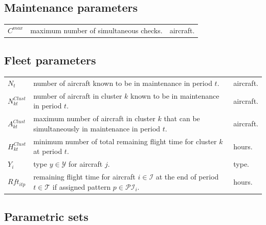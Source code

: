\documentclass[a4paper,11pt]{article}
\begin{document}
    \subsection{Maintenance parameters}

        \begin{tabular}{p{15mm}p{125mm}p{15mm}}
            $C^{max}$         & maximum number of simultaneous checks. & aircraft. \\
        \end{tabular}

    \subsection{Fleet parameters}

        \begin{tabular}{p{15mm}p{125mm}p{15mm}}
            $N_t$               & number of aircraft known to be in maintenance in period $t$. & aircraft. \\
            $N^{Clust}_{kt}$    & number of aircraft in cluster $k$ known to be in maintenance in period $t$. & aircraft. \\
            $A^{Clust}_{kt}$    & maximum number of aircraft in cluster $k$ that can be simultaneously in maintenance in period $t$. & aircraft. \\
            $H^{Clust}_{kt}$    & minimum number of total remaining flight time for cluster $k$ at period $t$. & hours. \\
            $Y_i$               & type $y \in \mathcal{Y}$ for aircraft $j$. & type. \\
            $Rft_{itp}$           & remaining flight time for aircraft $i \in \mathcal{I}$ at the end of period $t \in \mathcal{T}$ if assigned pattern $p \in \mathcal{PI}_i$. & hours. \\
        \end{tabular}

    \subsection{Parametric sets}
\end{document}
